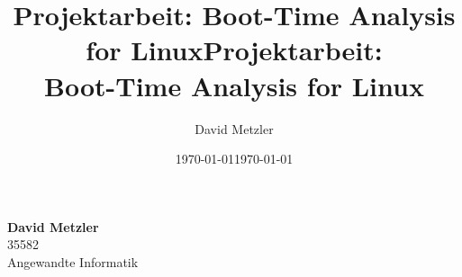 \documentclass[12pt, a4paper]{scrartcl}
\author{David Metzler}
\title{Projektarbeit: Boot-Time Analysis for Linux}
\date{\today}
\begin{document}
\title{\Huge Projektarbeit: \\ Boot-Time Analysis for Linux}
\date{\today}
\maketitle
\vspace{4cm}
\begin{minipage}{1.1\textwidth}
	\flushright
	\textbf{David Metzler}\\
	35582 \\
	Angewandte Informatik
\end{minipage}
\newpage

\tableofcontents
\newpage











\printbibliography
\end{document}
